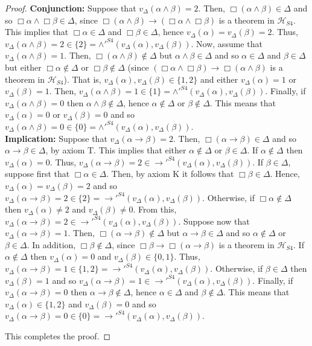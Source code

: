 \documentclass[12pt]{article}
\begin{document}
\begin{proof}
{\bf Conjunction:} Suppose that $v_\Delta(\alpha \land \beta)=2$. Then, $\Box(\alpha \land \beta) \in \Delta$ and so  $\Box\alpha \land \Box\beta \in \Delta$, since  $\Box(\alpha \land \beta) \to (\Box\alpha \land \Box\beta)$ is a theorem in  $\mathcal{H}_{S4}$. This implies that $\Box\alpha \in \Delta$ and $\Box\beta \in \Delta$, hence $v_\Delta(\alpha)=v_\Delta(\beta)=2$. Thus, $v_\Delta(\alpha \land \beta)=2 \in \{2\}= \land'^{S4}(v_\Delta(\alpha),v_\Delta(\beta))$. Now, assume  that $v_\Delta(\alpha \land \beta)=1$. Then, $\Box(\alpha \land \beta) \notin \Delta$ but $\alpha \land \beta \in \Delta$ and so $\alpha \in \Delta$ and $\beta \in \Delta$ but either  $\Box\alpha \notin \Delta$ or $\Box\beta \notin \Delta$ (since  $(\Box\alpha \land \Box\beta) \to \Box(\alpha \land \beta)$ is a theorem in  $\mathcal{H}_{S4}$).  That is,  $v_\Delta(\alpha), v_\Delta(\beta) \in \{1,2\}$ and either $v_\Delta(\alpha)=1$ or $v_\Delta(\beta)=1$.  Then, $v_\Delta(\alpha \land \beta)=1 \in  \{1\}=\land'^{S4}(v_\Delta(\alpha),v_\Delta(\beta))$. Finally, if $v_\Delta(\alpha \land \beta)=0$ then $\alpha \land \beta \notin \Delta$, hence $\alpha \notin \Delta$ or $\beta \notin \Delta$. This means that $v_\Delta(\alpha)=0$ or $v_\Delta(\beta)=0$ and so $v_\Delta(\alpha \land \beta)=0 \in  \{0\}=\land'^{S4}(v_\Delta(\alpha),v_\Delta(\beta))$.\\[1mm]
{\bf Implication:} Suppose that $v_\Delta(\alpha \to \beta)=2$. Then, $\Box(\alpha \to \beta) \in \Delta$ and so $\alpha \to \beta \in \Delta$, by axiom T. This implies that either $\alpha \notin \Delta$ or $\beta \in \Delta$. If $\alpha \notin \Delta$ then $v_\Delta(\alpha)=0$. Thus, $v_\Delta(\alpha \to \beta)=2 \in  {\to}'^{S4}(v_\Delta(\alpha),v_\Delta(\beta))$. If  $\beta \in \Delta$, suppose first that $\Box\alpha \in \Delta$. Then, by axiom K it follows that $\Box\beta \in \Delta$. Hence, $v_\Delta(\alpha)=v_\Delta(\beta)=2$ and so $v_\Delta(\alpha \to \beta)=2 \in  \{2\}={\to}'^{S4}(v_\Delta(\alpha),v_\Delta(\beta))$. Otherwise, if $\Box\alpha \notin \Delta$ then  $v_\Delta(\alpha)\neq 2$ and $v_\Delta(\beta)\neq 0$. From this, $v_\Delta(\alpha \to \beta)=2 \in  {\to}'^{S4}(v_\Delta(\alpha),v_\Delta(\beta))$. 
Suppose now that $v_\Delta(\alpha \to \beta)=1$. Then, $\Box(\alpha \to \beta) \notin \Delta$ but $\alpha \to \beta \in \Delta$  and so $\alpha \notin \Delta$ or $\beta \in \Delta$. In addition, $\Box\beta \notin \Delta$, since $\Box\beta \to \Box(\alpha \to \beta)$ is a theorem in  $\mathcal{H}_{S4}$. If $\alpha \notin \Delta$ then  $v_\Delta(\alpha)=0$ and $v_\Delta(\beta) \in \{0,1\}$.  Thus, $v_\Delta(\alpha \to \beta)=1 \in  \{1,2\}={\to}'^{S4}(v_\Delta(\alpha),v_\Delta(\beta))$. Otherwise, if $\beta \in \Delta$ then $v_\Delta(\beta)=1$ and so $v_\Delta(\alpha \to \beta)=1 \in  {\to}'^{S4}(v_\Delta(\alpha),v_\Delta(\beta))$.
Finally, if $v_\Delta(\alpha \to \beta)=0$ then $\alpha \to \beta \notin \Delta$, hence $\alpha \in \Delta$ and $\beta \notin \Delta$. This means that $v_\Delta(\alpha)  \in  \{1,2\}$ and $v_\Delta(\beta)=0$ and so $v_\Delta(\alpha \to \beta)=0 \in  \{0\}={\to}'^{S4}(v_\Delta(\alpha),v_\Delta(\beta))$.

This completes the proof.
\end{proof}
\end{document}
